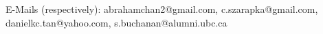 \documentclass[journal]{IEEEtran}
\begin{document}

\begin{IEEEbiographynophoto}{E-Mails (respectively):}
abrahamchan2@gmail.com,
c.szarapka@gmail.com,
danielkc.tan@yahoo.com,
s.buchanan@alumni.ubc.ca
\end{IEEEbiographynophoto}

\end{document}
